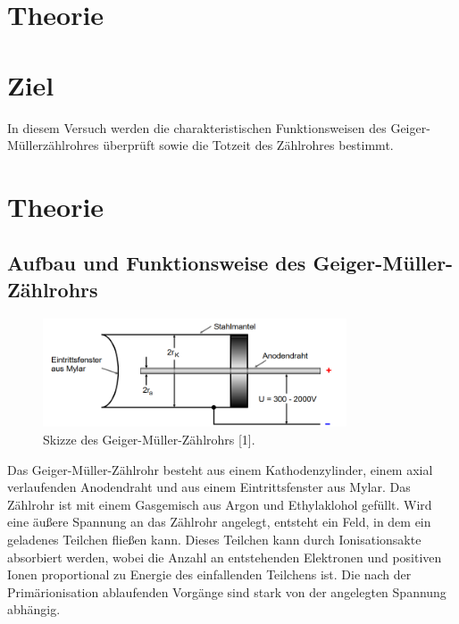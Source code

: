 \section{Theorie}
\label{sec:Theorie}

\section{Ziel}
In diesem Versuch werden die charakteristischen Funktionsweisen des Geiger-Müllerzählrohres überprüft sowie die Totzeit des Zählrohres bestimmt.

\section{Theorie}
\subsection{Aufbau und Funktionsweise des Geiger-Müller-Zählrohrs}
\begin{figure}[H] 
  \centering 
  \includegraphics[width=9cm]{1} 
  \caption{Skizze des Geiger-Müller-Zählrohrs [1].} \label{fig:1} 
\end{figure}
Das Geiger-Müller-Zählrohr besteht aus einem Kathodenzylinder, einem axial verlaufenden Anodendraht und aus einem Eintrittsfenster aus Mylar. Das Zählrohr ist mit einem Gasgemisch aus Argon und Ethylaklohol gefüllt. Wird eine äußere Spannung an das Zählrohr angelegt, entsteht ein Feld, in dem ein geladenes Teilchen fließen kann. Dieses Teilchen kann durch Ionisationsakte absorbiert werden, wobei die Anzahl an entstehenden Elektronen und positiven Ionen proportional zu Energie des einfallenden Teilchens ist. Die nach der Primärionisation ablaufenden Vorgänge sind stark von der angelegten Spannung abhängig.\\
